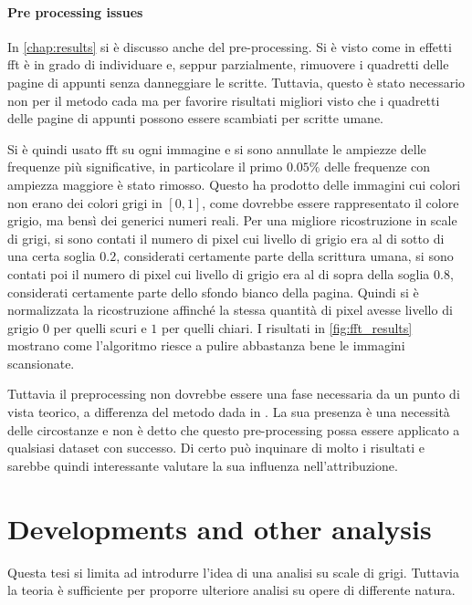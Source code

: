 \paragraph{Pre processing issues}
In \cref{chap:results} si è discusso anche del pre-processing. Si è visto come in effetti \gls{fft} è in grado di individuare e, seppur parzialmente, rimuovere i quadretti delle pagine di appunti senza danneggiare le scritte. Tuttavia, questo è stato necessario non per il metodo \gls{cada} ma per favorire risultati migliori visto che i quadretti delle pagine di appunti possono essere scambiati per scritte umane.

\noindent Si è quindi usato \gls{fft} su ogni immagine e si sono annullate le ampiezze delle frequenze più significative, in particolare il primo $0.05\%$ delle frequenze con ampiezza maggiore è stato rimosso. Questo ha prodotto delle immagini cui colori non erano dei colori grigi in $\left[0,1\right]$, come dovrebbe essere rappresentato il colore grigio, ma bensì dei generici numeri reali. Per una migliore ricostruzione in scale di grigi, si sono contati il numero di pixel cui livello di grigio era al di sotto di una certa soglia $0.2$, considerati certamente parte della scrittura umana, si sono contati poi il numero di pixel cui livello di grigio era al di sopra della soglia $0.8$, considerati certamente parte dello sfondo bianco della pagina. Quindi si è normalizzata la ricostruzione affinché la stessa quantità di pixel avesse livello di grigio $0$ per quelli scuri e $1$ per quelli chiari. I risultati in \cref{fig:fft_results} mostrano come l'algoritmo riesce a pulire abbastanza bene le immagini scansionate.

\noindent Tuttavia il preprocessing non dovrebbe essere una fase necessaria da un punto di vista teorico, a differenza del metodo \gls{dada} in \cite{thesis}. La sua presenza è una necessità delle circostanze e non è detto che questo pre-processing possa essere applicato a qualsiasi dataset con successo. Di certo può inquinare di molto i risultati e sarebbe quindi interessante valutare la sua influenza nell'attribuzione.

\section{Developments and other analysis}
Questa tesi si limita ad introdurre l'idea di una analisi su scale di grigi. Tuttavia la teoria è sufficiente per proporre ulteriore analisi su opere di differente natura.

